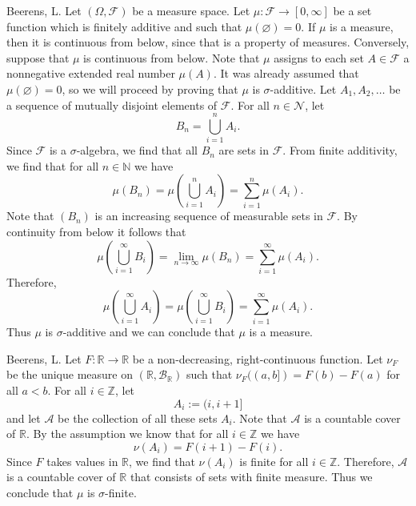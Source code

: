 \begin{solution}[3.14]{Beerens, L.}
    Let $(\Omega,\mathcal{F})$ be a measure space. Let $\mu:\mathcal{F}\rightarrow[0,\infty]$ be a set function which is finitely additive and such that $\mu(\varnothing) = 0$. If $\mu$ is a measure, then it is continuous from below, since that is a property of measures. Conversely, suppose that $\mu$ is continuous from below. Note that $\mu$ assigns to each set $A\in\mathcal{F}$ a nonnegative extended real number $\mu(A)$. It was already assumed that $\mu(\varnothing) =0$, so we will proceed by proving that $\mu$ is $\sigma$-additive. Let $A_1, A_2,\hdots$ be a sequence of mutually disjoint elements of $\mathcal{F}$. For all $n\in\mathcal{N}$, let 
    $$
        B_n = \bigcup_{i=1}^n A_i.
    $$
    Since $\mathcal{F}$ is a $\sigma$-algebra, we find that all $B_n$ are sets in $\mathcal{F}$.
    From finite additivity, we find that for all $n\in\mathbb{N}$ we have
    $$
        \mu(B_n) = \mu\left( \bigcup_{i=1}^n A_i \right) = \sum_{i=1}^n \mu(A_i). 
    $$
    Note that $(B_n)$ is an increasing sequence of measurable sets in $\mathcal{F}$. By continuity from below it follows that
    $$
        \mu\left( \bigcup_{i=1}^\infty B_i \right) = \lim_{n\rightarrow\infty}\mu(B_n) = \sum_{i=1}^\infty\mu(A_i).
    $$
    Therefore,
    $$
        \mu\left( \bigcup_{i=1}^\infty A_i \right) = \mu\left( \bigcup_{i=1}^\infty B_i \right) = \sum_{i=1}^\infty\mu(A_i).
    $$
    Thus $\mu$ is $\sigma$-additive and we can conclude that $\mu$ is a measure.
\end{solution}

\begin{solution}[3.21]{Beerens, L.}
    Let $F:\mathbb{R}\rightarrow\mathbb{R}$ be a non-decreasing, right-continuous function. Let $\nu_F$ be the unique measure on $(\mathbb{R},\mathcal{B}_\mathbb{R})$ such that $\nu_F((a,b])=F(b)-F(a)$ for all $a<b$. For all $i\in\mathbb{Z}$, let
    $$
        A_i:= (i,i+1]
    $$
    and let $\mathcal{A}$ be the collection of all these sets $A_i$. Note that $\mathcal{A}$ is a countable cover of $\mathbb{R}$. By the assumption we know that for all $i\in\mathbb{Z}$ we have
    $$
        \nu(A_i)  = F(i+1) - F(i).
    $$
    Since $F$ takes values in $\mathbb{R}$, we find that $\nu(A_i)$ is finite for all $i\in\mathbb{Z}$. Therefore, $\mathcal{A}$ is a countable cover of $\mathbb{R}$ that consists of sets with finite measure. Thus we conclude that $\mu$ is $\sigma$-finite.
\end{solution}